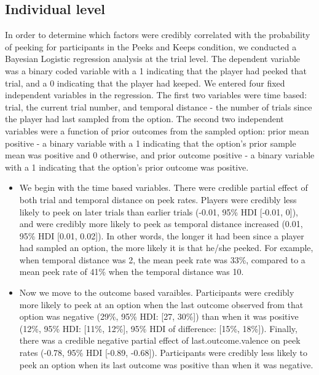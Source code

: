 \documentclass[a4paper,doc,natbib,floatsintext]{apa6}\usepackage[]{graphicx}\usepackage[]{color}
\begin{document}
\subsection{Individual level}



In order to determine which factors were credibly correlated with the probability of peeking for participants in the Peeks and Keeps condition, we conducted a Bayesian Logistic regression analysis at the trial level. The dependent variable was a binary coded variable with a 1 indicating that the player had peeked that trial, and a 0 indicating that the player had keeped. We entered four fixed independent variables in the regression. The first two variables were time based: trial, the current trial number, and temporal distance - the number of trials since the player had last sampled from the option. The second two independent variables were a function of prior outcomes from the sampled option: prior mean positive - a binary variable with a 1 indicating that the option's prior sample mean was positive and 0 otherwise, and prior outcome positive - a binary variable with a 1 indicating that the option's prior outcome was positive.

\begin{itemize}



\item We begin with the time based variables. There were credible partial effect of both trial and temporal distance on peek rates. Players were credibly less likely to peek on later trials than earlier trials (-0.01, 95\% HDI [-0.01, 0]), and were credibly more likely to peek as temporal distance increased (0.01, 95\% HDI [0.01, 0.02]). In other words, the longer it had been since a player had sampled an option, the more likely it is that he/she peeked. For example, when temporal distance was 2, the mean peek rate was 33\%, compared to a mean peek rate of 41\% when the temporal distance was 10.

 \item Now we move to the outcome based varaibles. Participants were credibly more likely to peek at an option when the last outcome observed from that option was negative (29\%, 95\% HDI: [27, 30\%]) than when it was positive (12\%, 95\% HDI: [11\%, 12\%], 95\% HDI of difference: [15\%, 18\%]). Finally, there was a credible negative partial effect of last.outcome.valence on peek rates (-0.78, 95\% HDI [-0.89, -0.68]). Participants were credibly less likely to peek an option when its last outcome was positive than when it was negative.



\end{itemize}
\end{document}
